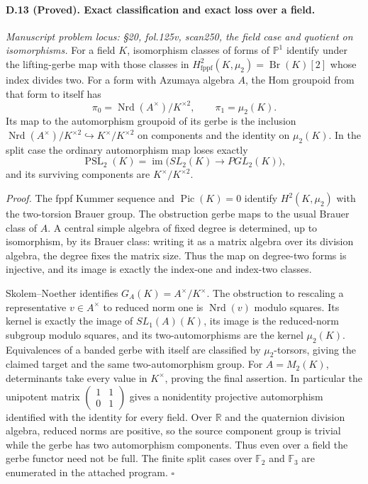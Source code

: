 \paragraph{D.13 (Proved). Exact classification and exact loss over a field.}
\emph{Manuscript problem locus: \S20, fol.125v, scan250, the field case and quotient on isomorphisms.}
For a field $K$, isomorphism classes of forms of $\mathbb P^1$ identify under the lifting-gerbe map with those classes in $H^2_{\mathrm{fppf}}(K,\mu_2)=\operatorname{Br}(K)[2]$ whose index divides two. For a form with Azumaya algebra $A$, the Hom groupoid from that form to itself has
\[
\pi_0=\operatorname{Nrd}(A^\times)/K^{\times2},
\qquad \pi_1=\mu_2(K).
\]
Its map to the automorphism groupoid of its gerbe is the inclusion
$\operatorname{Nrd}(A^\times)/K^{\times2}\hookrightarrow K^\times/K^{\times2}$ on components and the identity on $\mu_2(K)$. In the split case the ordinary automorphism map loses exactly
\[
\operatorname{PSL}_2(K)
 =\operatorname{im}\bigl(SL_2(K)\to PGL_2(K)\bigr),
\]
and its surviving components are $K^\times/K^{\times2}$.

\emph{Proof.} The fppf Kummer sequence and $\operatorname{Pic}(K)=0$ identify $H^2(K,\mu_2)$ with the two-torsion Brauer group. The obstruction gerbe maps to the usual Brauer class of $A$. A central simple algebra of fixed degree is determined, up to isomorphism, by its Brauer class: writing it as a matrix algebra over its division algebra, the degree fixes the matrix size. Thus the map on degree-two forms is injective, and its image is exactly the index-one and index-two classes.

Skolem--Noether identifies $G_A(K)=A^\times/K^\times$. The obstruction to rescaling a representative $v\in A^\times$ to reduced norm one is $\operatorname{Nrd}(v)$ modulo squares. Its kernel is exactly the image of $SL_1(A)(K)$, its image is the reduced-norm subgroup modulo squares, and its two-automorphisms are the kernel $\mu_2(K)$. Equivalences of a banded gerbe with itself are classified by $\mu_2$-torsors, giving the claimed target and the same two-automorphism group. For $A=M_2(K)$, determinants take every value in $K^\times$, proving the final assertion. In particular the unipotent matrix $\left(\begin{smallmatrix}1&1\\0&1\end{smallmatrix}\right)$ gives a nonidentity projective automorphism identified with the identity for every field. Over $\mathbb R$ and the quaternion division algebra, reduced norms are positive, so the source component group is trivial while the gerbe has two automorphism components. Thus even over a field the gerbe functor need not be full. The finite split cases over $\mathbb F_2$ and $\mathbb F_3$ are enumerated in the attached program. \hfill$\square$

